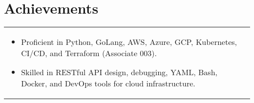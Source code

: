\documentclass[a4paper,10pt]{article}
\begin{document}
\section{Achievements}
\begin{tabularx}{\linewidth}{@{}l r@{}}
\begin{minipage}[t]{\linewidth}
\begin{itemize}[nosep,after=\strut, leftmargin=2em]
\item Proficient in Python, GoLang, AWS, Azure, GCP, Kubernetes, CI/CD, and Terraform (Associate 003).
\item Skilled in RESTful API design, debugging, YAML, Bash, Docker, and DevOps tools for cloud infrastructure.
\end{itemize}
\end{minipage}
\end{tabularx}
\end{document}
